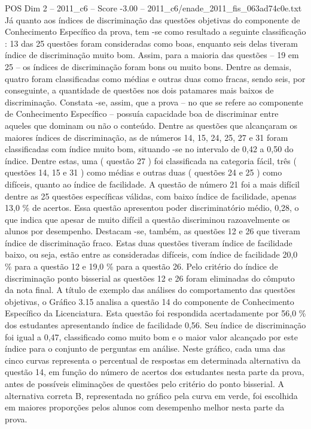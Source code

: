 \begin{textsample}{POS Dim 2 – 2011\_c6 – Score -3.00 – 2011\_c6/enade\_2011\_fis\_063ad74c0e.txt}
Já quanto aos índices de discriminação das questões objetivas do componente de Conhecimento Específico da prova, tem -se como resultado a seguinte classificação : 13 das 25 questões foram consideradas como boas, enquanto seis delas tiveram índice de discriminação muito bom.
Assim, para a maioria das questões – 19 em 25 – os índices de discriminação foram bons ou muito bons.
Dentre as demais, quatro foram classificadas como médias e outras duas como fracas, sendo seis, por conseguinte, a quantidade de questões nos dois patamares mais baixos de discriminação.
Constata -se, assim, que a prova – no que se refere ao componente de Conhecimento Específico – possuía capacidade boa de discriminar entre aqueles que dominam ou não o conteúdo.
Dentre as questões que alcançaram os maiores índices de discriminação, as de números 14, 15, 24, 25, 27 e 31 foram classificadas com índice muito bom, situando -se no intervalo de 0,42 a 0,50 do índice.
Dentre estas, uma ( questão 27 ) foi classificada na categoria fácil, três ( questões 14, 15 e 31 ) como médias e outras duas ( questões 24 e 25 ) como difíceis, quanto ao índice de facilidade.
A questão de número 21 foi a mais difícil dentre as 25 questões específicas válidas, com baixo índice de facilidade, apenas 13,0 \% de acertos.
Essa questão apresentou poder discriminatório médio, 0,28, o que indica que apesar de muito difícil a questão discriminou razoavelmente os alunos por desempenho.
Destacam -se, também, as questões 12 e 26 que tiveram índice de discriminação fraco.
Estas duas questões tiveram índice de facilidade baixo, ou seja, estão entre as consideradas difíceis, com índice de facilidade 20,0 \% para a questão 12 e 19,0 \% para a questão 26.
Pelo critério do índice de discriminação ponto bisserial as questões 12 e 26 foram eliminadas do cômputo da nota final.
A título de exemplo das análises do comportamento das questões objetivas, o Gráfico 3.15 analisa a questão 14 do componente de Conhecimento Específico da Licenciatura.
Esta questão foi respondida acertadamente por 56,0 \% dos estudantes apresentando índice de facilidade 0,56.
Seu índice de discriminação foi igual a 0,47, classificado como muito bom e o maior valor alcançado por este índice para o conjunto de perguntas em análise.
Neste gráfico, cada uma das cinco curvas representa o percentual de respostas em determinada alternativa da questão 14, em função do número de acertos dos estudantes nesta parte da prova, antes de possíveis eliminações de questões pelo critério do ponto bisserial.
A alternativa correta B, representada no gráfico pela curva em verde, foi escolhida em maiores proporções pelos alunos com desempenho melhor nesta parte da prova.

\end{textsample}
